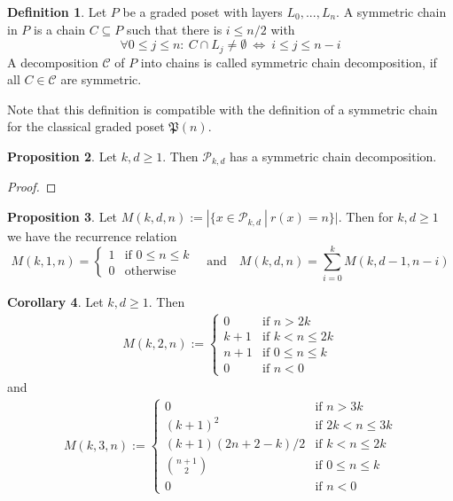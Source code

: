 \documentclass{scrartcl}
\newcommand{\powerset}{\mathfrak{P}}
\theoremstyle{definition}
\newtheorem{definition}{Definition}
\newtheorem{proposition}[definition]{Proposition}
\newtheorem{corollary}[definition]{Corollary}
\begin{document}
\begin{definition}
    Let $P$ be a graded poset with layers $L_0, ..., L_n$.
    A symmetric chain in $P$ is a chain $C \subseteq P$ such that there is $i \leq n/2$ with
    \begin{equation*}
        \forall 0 \leq j \leq n: \ C \cap L_j \neq \emptyset \ \Leftrightarrow \ i \leq j \leq n - i
    \end{equation*}
    A decomposition $\mathcal{C}$ of $P$ into chains is called symmetric chain decomposition, if all $C \in \mathcal{C}$ are symmetric.
\end{definition}
Note that this definition is compatible with the definition of a symmetric chain for the classical graded poset $\powerset(n)$.
\begin{proposition}
    Let $k, d \geq 1$. Then $\mathcal{P}_{k, d}$ has a symmetric chain decomposition.
\end{proposition}
\begin{proof}
    
\end{proof}
\begin{proposition}
    Let $M(k, d, n) := |\{ x \in \mathcal{P}_{k, d} \ | \ r(x) = n\}|$. Then for $k, d \geq 1$ we have the recurrence relation
    \begin{equation*}
        M(k, 1, n) = \begin{cases}
            1 & \text{if $0 \leq n \leq k$} \\
            0 & \text{otherwise}
        \end{cases}
        \quad \text{and} \quad
        M(k, d, n) = \sum_{i = 0}^k M(k, d - 1, n - i)
    \end{equation*}
\end{proposition}
\begin{corollary}
    Let $k, d \geq 1$. Then
    \begin{align*}
        M(k, 2, n) := \begin{cases}
            0 & \text{if $n > 2k$} \\
            k + 1 & \text{if $k < n \leq 2k$} \\
            n + 1 & \text{if $0 \leq n \leq k$} \\
            0 & \text{if $n < 0$}
        \end{cases}
    \end{align*}
    and
    \begin{align*}
        M(k, 3, n) := \begin{cases}
            0 & \text{if $n > 3k$} \\
            (k + 1)^2 & \text{if $2k < n \leq 3k$} \\
            (k + 1)(2n + 2 - k) / 2 & \text{if $k < n \leq 2k$} \\
            {n + 1 \choose 2} & \text{if $0 \leq n \leq k$} \\
            0 & \text{if $n < 0$}
        \end{cases}
    \end{align*}
\end{corollary}
\end{document}
